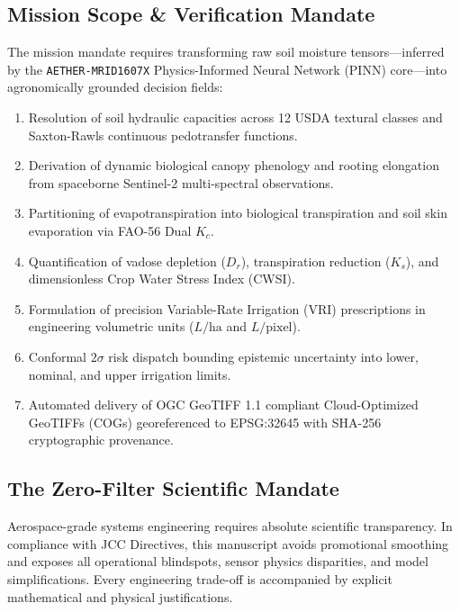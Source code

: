 \documentclass[11pt,a4paper]{article}
\theoremstyle{definition}
\theoremstyle{remark}
\begin{document}
\subsection{Mission Scope \& Verification Mandate}
The mission mandate requires transforming raw soil moisture tensors—inferred by the \texttt{AETHER-MRID1607X} Physics-Informed Neural Network (PINN) core—into agronomically grounded decision fields:
\begin{enumerate}
    \item Resolution of soil hydraulic capacities across 12 USDA textural classes and Saxton-Rawls continuous pedotransfer functions.
    \item Derivation of dynamic biological canopy phenology and rooting elongation from spaceborne Sentinel-2 multi-spectral observations.
    \item Partitioning of evapotranspiration into biological transpiration and soil skin evaporation via FAO-56 Dual $K_c$.
    \item Quantification of vadose depletion ($D_r$), transpiration reduction ($K_s$), and dimensionless Crop Water Stress Index (CWSI).
    \item Formulation of precision Variable-Rate Irrigation (VRI) prescriptions in engineering volumetric units ($L/\text{ha}$ and $L/\text{pixel}$).
    \item Conformal $2\sigma$ risk dispatch bounding epistemic uncertainty into lower, nominal, and upper irrigation limits.
    \item Automated delivery of OGC GeoTIFF 1.1 compliant Cloud-Optimized GeoTIFFs (COGs) georeferenced to EPSG:32645 with SHA-256 cryptographic provenance.
\end{enumerate}

\subsection{The Zero-Filter Scientific Mandate}
Aerospace-grade systems engineering requires absolute scientific transparency. In compliance with JCC Directives, this manuscript avoids promotional smoothing and exposes all operational blindspots, sensor physics disparities, and model simplifications. Every engineering trade-off is accompanied by explicit mathematical and physical justifications.
\end{document}
